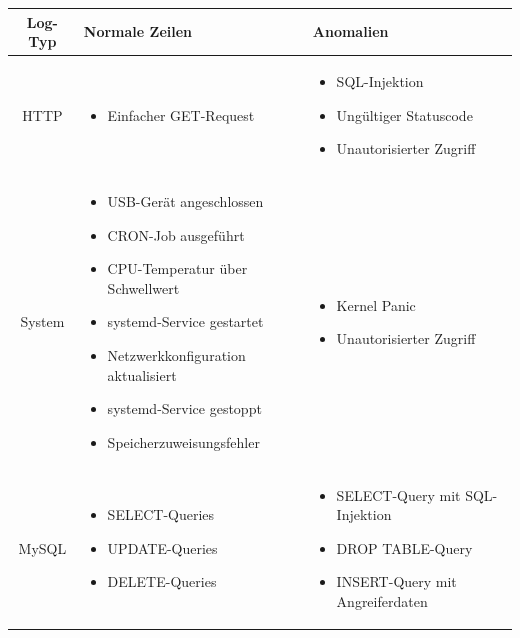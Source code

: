 \documentclass[a4paper,12pt]{report}
\begin{document}
    \begin{table}[h!]
        \centering
        \setlength{\leftmargini}{0.4cm}
        \begin{tabular}{|c|p{6cm}|p{6cm}|}
            \hline
            \textbf{Log-Typ} & \textbf{Normale Zeilen} & \textbf{Anomalien} \\ \hline
            \textnormal{HTTP} &
            \begin{itemize}
                \item Einfacher GET-Request
            \end{itemize} &
            \begin{itemize}
                \item SQL-Injektion
                \item Ungültiger Statuscode
                \item Unautorisierter Zugriff
            \end{itemize} \\ \hline

            \textnormal{System} &
            \begin{itemize}
                \item USB-Gerät angeschlossen
                \item CRON-Job ausgeführt
                \item CPU-Temperatur über Schwellwert
                \item systemd-Service gestartet
                \item Netzwerkkonfiguration aktualisiert
                \item systemd-Service gestoppt
                \item Speicherzuweisungsfehler
            \end{itemize} &
            \begin{itemize}
                \item Kernel Panic
                \item Unautorisierter Zugriff
            \end{itemize} \\ \hline

            \textnormal{MySQL} &
            \begin{itemize}
                \item SELECT-Queries
                \item UPDATE-Queries
                \item DELETE-Queries
            \end{itemize} &
            \begin{itemize}
                \item SELECT-Query mit SQL-Injektion
                \item DROP TABLE-Query
                \item INSERT-Query mit Angreiferdaten
            \end{itemize} \\ \hline


\end{tabular}
\end{table}
\end{document}
